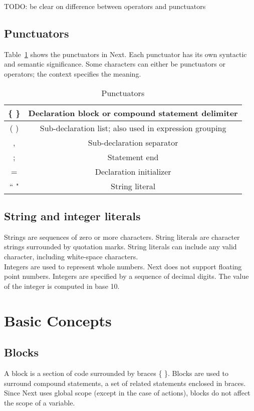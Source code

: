 \documentclass[12pt]{article}
\begin{document}
TODO: be clear on difference between operators and punctuators

\subsection{Punctuators}
Table~\ref{punctuators} shows the punctuators in Next.  Each punctuator has its own syntactic and semantic significance.  Some characters can either be punctuators or operators; the context specifies the meaning.

\begin{table}[htdp]
\caption{Punctuators}
\begin{center}
\begin{tabular}{|c|c|}
\hline
\{ \} & Declaration block or compound statement delimiter \\
\hline
( ) & Sub-declaration list; also used in expression grouping \\
\hline
, & Sub-declaration separator \\
\hline
; & Statement end \\
\hline
= & Declaration initializer \\
\hline 
`` " & String literal \\
\hline
\end{tabular}
\end{center}
\label{punctuators}
\end{table}%

\subsection{String and integer literals}
Strings are sequences of zero or more characters.  String literals are character strings surrounded by quotation marks.  String literals can include any valid character, including white-space characters. \\

\noindent Integers are used to represent whole numbers.  Next does not support floating point numbers.  Integers are specified by a sequence of decimal digits.  The value of the integer is computed in base 10.

\section{Basic Concepts}

\subsection{Blocks}
A block is a section of code surrounded by braces \{ \}.  Blocks are used to surround compound statements, a set of related statements enclosed in braces.   Since Next uses global scope (except in the case of actions), blocks do not affect the scope of a variable.
\end{document}
